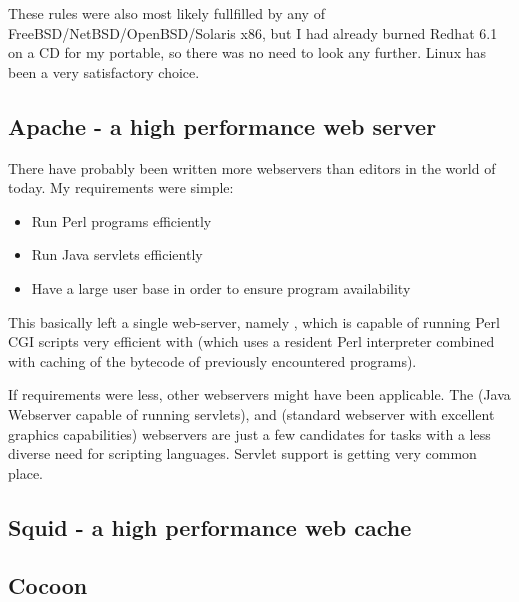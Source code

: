These rules were also most likely fullfilled by any of
FreeBSD/NetBSD/OpenBSD/Solaris x86, but I had already burned
Redhat 6.1 on a CD for my portable, so there was no need to
look any further.  Linux has been a very satisfactory
choice.

\subsection{Apache - a high performance web server}
\label{sec:apache}

There have probably been written more webservers than
editors in the world of today.  My requirements were simple:

\begin{itemize}
\item Run Perl programs efficiently
\item Run Java servlets efficiently
\item Have a large user base in order to ensure program
  availability
\end{itemize}

This basically left a single web-server, namely
, which is capable of
running Perl CGI scripts very efficient with
 (which uses a resident Perl interpreter combined
with caching of the bytecode of previously encountered
programs).

If requirements were less, other webservers might have been
applicable.  The
(Java Webserver capable of running servlets),
and  (standard webserver
with excellent graphics capabilities) webservers are just a
few candidates for tasks with a less diverse need for
scripting languages.  Servlet support is getting very common
place.


\subsection{Squid - a high performance web cache}
\label{sec:squid}



\subsection{Cocoon}
\label{sec:cocoon}



